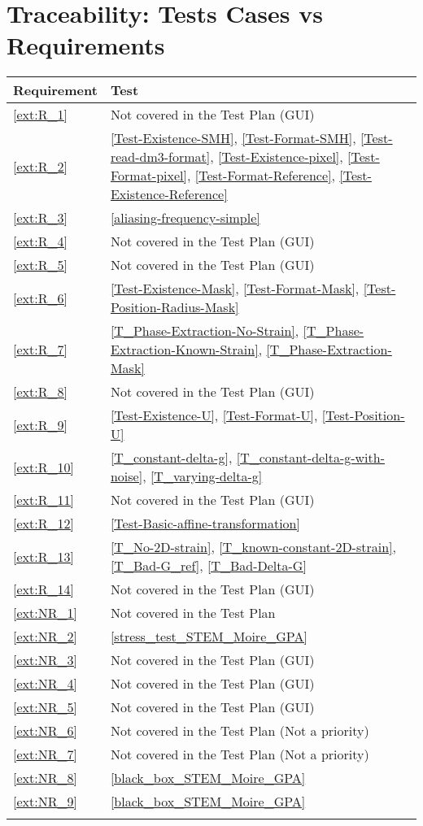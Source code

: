 \documentclass[12pt, titlepage]{article}
\begin{document}
\section{Traceability: Tests Cases vs Requirements}		

\noindent 
\begin{longtable}{l p{10cm}} 
\toprule
\textbf{Requirement} & \textbf{Test}\\
\midrule
\endhead
\cref{ext:R_1} & Not covered in the Test Plan (GUI)\\
\cref{ext:R_2} & \cref{Test-Existence-SMH}, \cref{Test-Format-SMH}, \cref{Test-read-dm3-format}, \cref{Test-Existence-pixel}, \cref{Test-Format-pixel}, \cref{Test-Format-Reference}, \cref{Test-Existence-Reference} \\
\cref{ext:R_3} & \cref{aliasing-frequency-simple}\\
\cref{ext:R_4} & Not covered in the Test Plan (GUI)\\
\cref{ext:R_5} & Not covered in the Test Plan (GUI)\\
\cref{ext:R_6} & \cref{Test-Existence-Mask}, \cref{Test-Format-Mask}, \cref{Test-Position-Radius-Mask}\\
\cref{ext:R_7} & \cref{T_Phase-Extraction-No-Strain}, \cref{T_Phase-Extraction-Known-Strain}, \cref{T_Phase-Extraction-Mask} \\
\cref{ext:R_8} & Not covered in the Test Plan (GUI)\\
\cref{ext:R_9} & \cref{Test-Existence-U}, \cref{Test-Format-U}, \cref{Test-Position-U} \\
\cref{ext:R_10} & \cref{T_constant-delta-g}, \cref{T_constant-delta-g-with-noise}, \cref{T_varying-delta-g}\\
\cref{ext:R_11} & Not covered in the Test Plan (GUI)\\
\cref{ext:R_12} & \cref{Test-Basic-affine-transformation} \\
\cref{ext:R_13} & \cref{T_No-2D-strain}, \cref{T_known-constant-2D-strain}, \cref{T_Bad-G_ref}, \cref{T_Bad-Delta-G}\\
\cref{ext:R_14} & Not covered in the Test Plan (GUI)\\
\cref{ext:NR_1} & Not covered in the Test Plan\\
\cref{ext:NR_2} & \cref{stress_test_STEM_Moire_GPA}\\
\cref{ext:NR_3} & Not covered in the Test Plan (GUI)\\
\cref{ext:NR_4} & Not covered in the Test Plan (GUI)\\
\cref{ext:NR_5} & Not covered in the Test Plan (GUI)\\
\cref{ext:NR_6} & Not covered in the Test Plan (Not a priority)\\
\cref{ext:NR_7} & Not covered in the Test Plan (Not a priority)\\
\cref{ext:NR_8} & \cref{black_box_STEM_Moire_GPA}\\
\cref{ext:NR_9} & \cref{black_box_STEM_Moire_GPA}\\
\bottomrule
\label{table_traceability}
\end{longtable}




\newpage
\end{document}
